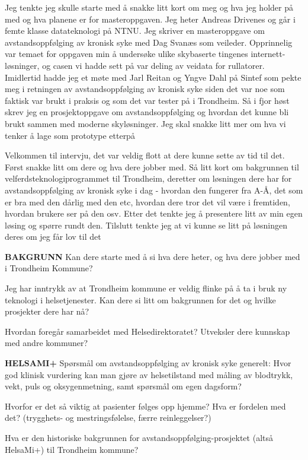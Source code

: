 Jeg tenkte jeg skulle starte med å snakke litt kort om meg og hva jeg holder på med og hva planene er for masteroppgaven. Jeg heter Andreas Drivenes og går i femte klasse datateknologi på NTNU. Jeg skriver en masteroppgave om avstandsoppfølging av kronisk syke med Dag Svanæs som veileder. Opprinnelig var temaet for oppgaven min å undersøke ulike skybaserte tingenes internett-løsninger, og casen vi hadde sett på var deling av veidata for rullatorer. Imidlertid hadde jeg et møte med Jarl Reitan og Yngve Dahl på Sintef som pekte meg i retningen av avstandsoppfølging av kronisk syke siden det var noe som faktisk var brukt i praksis og som det var tester på i Trondheim. Så i fjor høst skrev jeg en prosjektoppgave om avstandsoppfølging og hvordan det kunne bli brukt sammen med moderne skyløsninger. Jeg skal snakke litt mer om hva vi tenker å lage som prototype etterpå
 
Velkommen til intervju, det var veldig flott at dere kunne sette av tid til det. Først snakke litt om dere og hva dere jobber med. Så litt kort om bakgrunnen til velferdsteknologiprogrammet til Trondheim, deretter om løsningen dere har for avstandsoppfølging av kronisk syke i dag - hvordan den fungerer fra A-Å, det som er bra med den dårlig med den etc, hvordan dere tror det vil være i fremtiden, hvordan brukere ser på den osv. Etter det tenkte jeg å presentere litt av min egen løsing og spørre rundt den. Tilslutt tenkte jeg at vi kunne se litt på løsningen deres om jeg får lov til det
 
\textbf{BAKGRUNN}
Kan dere starte med å si hva dere heter, og hva dere jobber med i Trondheim Kommune?
 
Jeg har inntrykk av at Trondheim kommune er veldig flinke på å ta i bruk ny teknologi i helsetjenester. Kan dere si litt om bakgrunnen for det og hvilke prosjekter dere har nå?
 
Hvordan foregår samarbeidet med Helsedirektoratet? Utveksler dere kunnskap med andre kommuner?
 
\textbf{HELSAMI+}
Spørsmål om avstandsoppfølging av kronisk syke generelt:
Hvor god klinisk vurdering kan man gjøre av helsetilstand med måling av blodtrykk, vekt, puls og oksygenmetning, samt spørsmål om egen dagsform?
 
Hvorfor er det så viktig at pasienter følges opp hjemme? Hva er fordelen med det? (trygghets- og mestringsfølelse, færre reinleggelser?)
 
Hva er den historiske bakgrunnen for avstandsoppfølging-prosjektet (altså HelsaMi+) til Trondheim kommune? 
 
